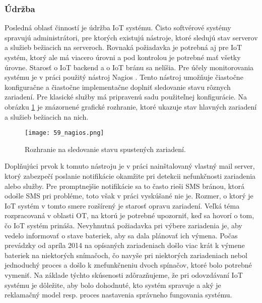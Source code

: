 \subsubsection{Údržba}
Posledná oblasť činností je údržba IoT systému. Čisto softvérové systémy spravujú administrátori, pre ktorých existujú nástroje, ktoré sledujú stav serverov a služieb bežiacich na serveroch. Rovnaká požiadavka je potrebná aj pre IoT systém, ktorý ale má viacero úrovni a pod kontrolou je potrebné mať všetky úrovne. Starosť o IoT backend a o IoT bránu sa nelíšia. Pre účely monitorovania systému je v práci použitý nástroj Nagios \cite{IOT35}. Tento nástroj umožňuje čiastočne konfiguračne a čiastočne implementačne doplniť sledovanie stavu rôznych zariadení. Pre klasické služby má pripravenú sadu použiteľnej konfigurácie. Na obrázku \ref{59_nagios} je znázornené grafické rozhranie, ktoré ukazuje stav hlavných zariadení a služieb bežiacich na nich.
\begin{figure}[!htbp]
\centering
\texttt{[image: 59\_nagios.png]}
\caption{Rozhranie na sledovanie stavu spustených zariadení.}
\label{59_nagios}
\end{figure}
Doplňujúci prvok k tomuto nástroju je v práci nainštalovaný vlastný mail server, ktorý zabezpečí poslanie notifikácie okamžite pri detekcii nefunkčnosti zariadenia alebo služby. Pre promptnejšie notifikácie sa to často rieši SMS bránou, ktorá odošle SMS pri probléme, toto však v práci vyskúšané nie je. Rozmer, o ktorý je IoT systém v tomto smere rozšírený je starosť opravu zariadení. Veľká téma rozpracovaná v oblasti OT, na ktorú je potrebné upozorniť, keď sa hovorí o tom, čo IoT systém prináša. Nevyhnutná požiadavka pri výbere zariadenia je, aby vedelo informovať o stave bateriek, aby sa dala plánovať ich výmena. Počas prevádzky od apríla 2014 na opísaných zariadeniach došlo viac krát k výmene bateriek na niektorých snímačoch, čo navyše pri niektorých zariadeniach nebol jednoduchý proces a došlo k znefunkčneniu dvoch spínačov, ktoré bolo potrebné vymeniť. Na základe týchto skúsenosti zdôrazňujeme, že pri odovzdávaní IoT systému je dôležite, aby bolo dohodnuté, kto systém spravuje a aký je reklamačný model resp. proces nastavenia správneho fungovania systému.
